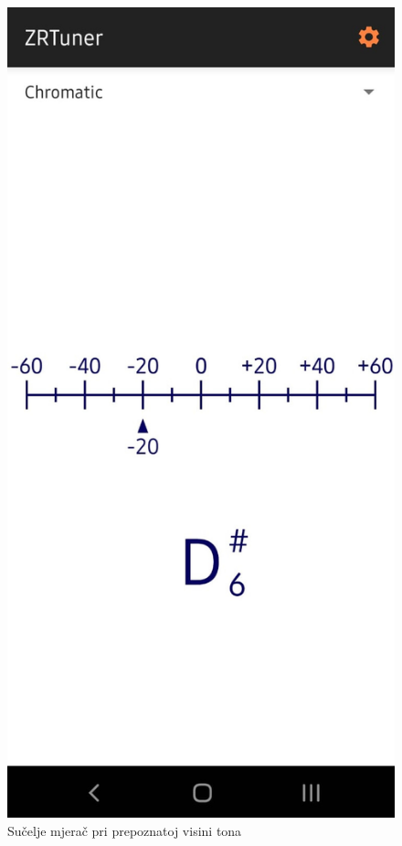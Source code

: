 \documentclass[times, utf8, zavrsni, numeric]{fer}
\begin{document}
\begin{figure}
	\centerline{\includegraphics[height=0.9\textheight]{zrtuner_note.jpeg}}
	\caption{Sučelje mjerač pri prepoznatoj visini tona}
	\label{fig}
\end{figure}
\end{document}
